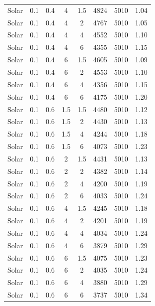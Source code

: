 \begin{table}
\begin{tabular}{cccccccc}
		Solar & 0.1 & 0.4 & 4 & 1.5 & 4824 & 5010 & 1.04 \\
		Solar & 0.1 & 0.4 & 4 & 2 & 4767 & 5010 & 1.05 \\
		Solar & 0.1 & 0.4 & 4 & 4 & 4552 & 5010 & 1.10 \\
		Solar & 0.1 & 0.4 & 4 & 6 & 4355 & 5010 & 1.15 \\
		Solar & 0.1 & 0.4 & 6 & 1.5 & 4605 & 5010 & 1.09 \\
		Solar & 0.1 & 0.4 & 6 & 2 & 4553 & 5010 & 1.10 \\
		Solar & 0.1 & 0.4 & 6 & 4 & 4356 & 5010 & 1.15 \\
		Solar & 0.1 & 0.4 & 6 & 6 & 4175 & 5010 & 1.20 \\
		Solar & 0.1 & 0.6 & 1.5 & 1.5 & 4480 & 5010 & 1.12 \\
		Solar & 0.1 & 0.6 & 1.5 & 2 & 4430 & 5010 & 1.13 \\
		Solar & 0.1 & 0.6 & 1.5 & 4 & 4244 & 5010 & 1.18 \\
		Solar & 0.1 & 0.6 & 1.5 & 6 & 4073 & 5010 & 1.23 \\
		Solar & 0.1 & 0.6 & 2 & 1.5 & 4431 & 5010 & 1.13 \\
		Solar & 0.1 & 0.6 & 2 & 2 & 4382 & 5010 & 1.14 \\
		Solar & 0.1 & 0.6 & 2 & 4 & 4200 & 5010 & 1.19 \\
		Solar & 0.1 & 0.6 & 2 & 6 & 4033 & 5010 & 1.24 \\
		Solar & 0.1 & 0.6 & 4 & 1.5 & 4245 & 5010 & 1.18 \\
		Solar & 0.1 & 0.6 & 4 & 2 & 4201 & 5010 & 1.19 \\
		Solar & 0.1 & 0.6 & 4 & 4 & 4034 & 5010 & 1.24 \\
		Solar & 0.1 & 0.6 & 4 & 6 & 3879 & 5010 & 1.29 \\
		Solar & 0.1 & 0.6 & 6 & 1.5 & 4075 & 5010 & 1.23 \\
		Solar & 0.1 & 0.6 & 6 & 2 & 4035 & 5010 & 1.24 \\
		Solar & 0.1 & 0.6 & 6 & 4 & 3880 & 5010 & 1.29 \\
		Solar & 0.1 & 0.6 & 6 & 6 & 3737 & 5010 & 1.34 \\
		\bottomrule
		\end{tabular}
\end{table}	

